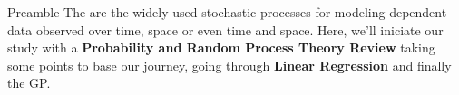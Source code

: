 \begin{frame}{Preamble} 
 The \textcolor{white}{} are the widely used stochastic processes for modeling dependent data observed over time, space or even time and space. Here, we'll iniciate our study with a \textbf{Probability and Random Process Theory Review} taking some points to base our journey, going through \textbf{Linear Regression} and finally the GP.
\end{frame}